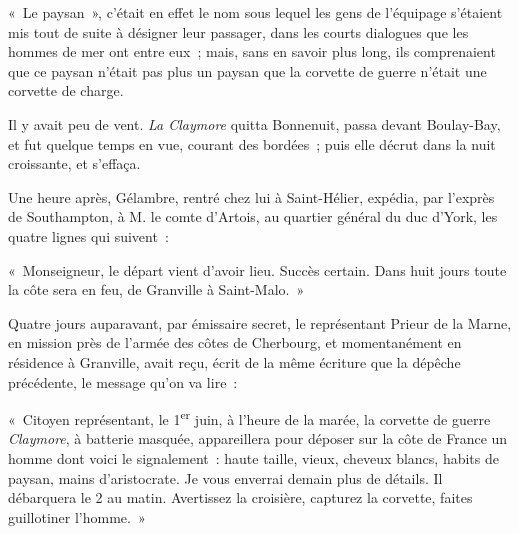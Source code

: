 \documentclass[french,twoside]{book} %
\begin{document}
« Le paysan », c’était en effet le nom sous lequel  les gens de l’équipage s’étaient mis tout de suite à désigner leur passager, dans les courts dialogues que les hommes de mer ont entre eux ; mais, sans en savoir plus long, ils comprenaient que ce paysan n’était pas plus un paysan que la corvette de guerre n’était une corvette de charge.\par
Il y avait peu de vent. \emph{La Claymore} quitta Bonnenuit, passa devant Boulay-Bay, et fut quelque temps en vue, courant des bordées ; puis elle décrut dans la nuit croissante, et s’effaça.\par
Une heure après, Gélambre, rentré chez lui à Saint-Hélier, expédia, par l’exprès de Southampton, à M. le comte d’Artois, au quartier général du duc d’York, les quatre lignes qui suivent :\par
« Monseigneur, le départ vient d’avoir lieu. Succès certain. Dans huit jours toute la côte sera en feu, de Granville à Saint-Malo. »\par
Quatre jours auparavant, par émissaire secret, le représentant Prieur de la Marne, en mission près de l’armée des côtes de Cherbourg, et momentanément en résidence à Granville, avait reçu, écrit de la même écriture que la dépêche précédente, le message qu’on va lire :\par
« Citoyen représentant, le 1\textsuperscript{er} juin, à l’heure de la marée, la corvette de guerre \emph{Claymore}, à batterie masquée, appareillera pour déposer sur la côte de France un homme dont voici le signalement : haute taille, vieux, cheveux blancs, habits de paysan, mains d’aristocrate. Je vous enverrai demain plus de détails. Il débarquera le 2 au matin. Avertissez la croisière, capturez la corvette, faites guillotiner l’homme. »
\end{document}
